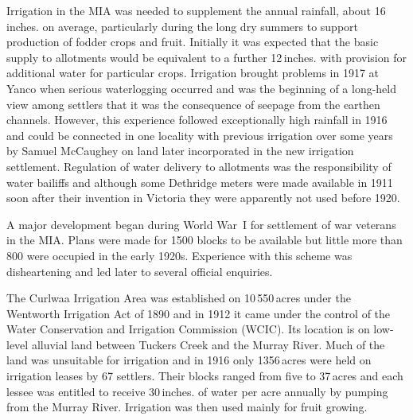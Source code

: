 Irrigation in the MIA was needed to supplement the annual rainfall,
about 16\,inches. on average, particularly during the long dry summers
to support production of fodder crops and
fruit.  Initially it was expected that the basic supply
to allotments would be equivalent to a further 12\,inches. with
provision for additional water for particular crops. Irrigation
brought problems in 1917 at Yanco when serious waterlogging
 occurred and was the beginning of a
long-held view among settlers that it was the consequence of
seepage from the earthen
channels.  However, this experience followed
exceptionally high rainfall in 1916 and could be connected in one
locality with previous irrigation over some years by Samuel McCaughey
on land later incorporated in the new irrigation settlement.
Regulation of water delivery to allotments was the responsibility of
water bailiffs and although some Dethridge meters
 were made available in 1911 soon
after their invention in Victoria they were apparently not used before
1920.

A major development began during World War~I for settlement of war
veterans in the MIA.  Plans were made for 1500 blocks to be available
but little more than 800 were occupied in the early 1920s.  Experience
with this scheme was disheartening and led later to several official
enquiries.

The Curlwaa Irrigation Area  was
established on 10\,550\,acres under the Wentworth Irrigation Act
 of 1890 and in 1912
it came under the control of the Water Conservation and Irrigation
Commission (WCIC).  Its location is on low-level alluvial land between
Tuckers Creek  and the Murray River. Much of the
land was unsuitable for irrigation and in 1916 only 1356\,acres were
held on irrigation leases by 67 settlers.  Their blocks ranged from
five to 37\,acres and each lessee was entitled to receive
30\,inches. of water per acre annually by
pumping from the
Murray River.  Irrigation was then used mainly for
fruit growing.


